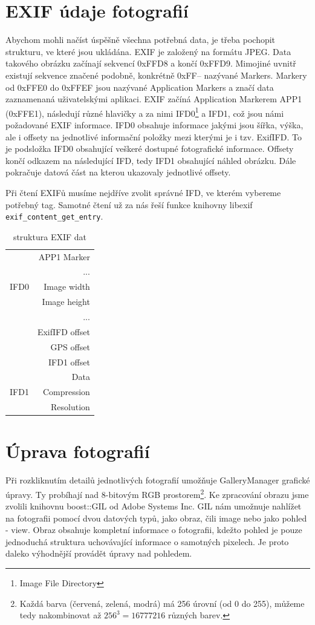 \documentclass[11pt,twoside,a4paper]{book}
\begin{document}
\section{EXIF údaje fotografií}
\indent
Abychom mohli načíst úspěšně všechna potřebná data, je třeba pochopit strukturu, ve které jsou ukládána. EXIF je založený na formátu JPEG. Data takového obrázku začínají sekvencí 0xFFD8 a končí 0xFFD9. Mimojiné uvnitř existují sekvence značené podobně, konkrétně 0xFF-- nazývané Markers. Markery od 0xFFE0 do  0xFFEF jsou nazývané Application Markers a značí data zaznamenaná uživatelskými aplikaci. EXIF začíná Application Markerem APP1 (0xFFE1), následují různé hlavičky a za nimi IFD0\footnote{Image File Directory} a IFD1, což jsou námi požadované EXIF informace. IFD0 obsahuje informace jakými jsou šířka, výška, ale i offsety na jednotlivé informační položky mezi kterými je i tzv. ExifIFD. To je podsložka IFD0 obsahující veškeré dostupné fotografické informace. Offsety končí odkazem na následující IFD, tedy IFD1 obsahující náhled obrázku. Dále pokračuje datová část na kterou ukazovaly jednotlivé offsety.

\indent
Při čtení EXIFů musíme nejdříve zvolit správné IFD, ve kterém vybereme potřebný tag. Samotné čtení už za nás řeší funkce knihovny libexif \verb|exif_content_get_entry|.

\begin{table}
\begin{center}
\begin{tabular}{|l|r|}
\hline
& APP1 Marker\\
& ... \\
\hline
IFD0 & Image width \\
& Image height \\ 
& ... \\
& ExifIFD offset \\
& GPS offset \\ 
& IFD1 offset \\
& Data \\
\hline
IFD1 & Compression \\
& Resolution \\
\hline
\end{tabular}
\end{center}
\caption{struktura EXIF dat}
\label{tab:tabexif}
\end{table}

\section{Úprava fotografií}
\noindent
Při rozkliknutím detailů jednotlivých fotografií umožňuje GalleryManager grafické úpravy. Ty probíhají nad 8-bitovým RGB prostorem\footnote{Každá barva (červená, zelená, modrá) má 256 úrovní (od 0 do 255), můžeme tedy nakombinovat až $256^{3}=16777216$ různých barev.}. Ke zpracování obrazu jsme zvolili knihovnu boost::GIL\cite{boostgil} od Adobe Systems Inc. GIL nám umožnuje nahlížet na fotografii pomocí dvou datových typů, jako obraz, čili image nebo jako pohled - view. Obraz obsahuje kompletní informace o fotografii, kdežto pohled je pouze jednoduchá struktura uchovávající informace o samotných pixelech. Je proto daleko výhodnější provádět úpravy nad pohledem.
\end{document}

